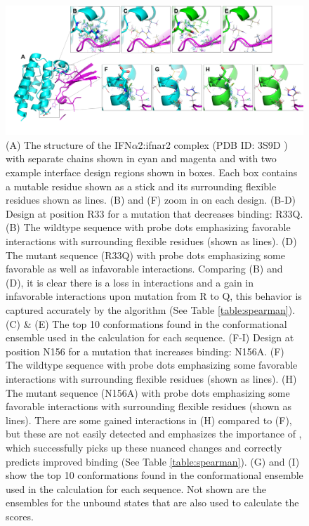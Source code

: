 \begin{figure}
 \center
 \includegraphics[width=\textwidth]{figures/designExamples.png}
 \caption{(A) The structure of the IFN$\alpha$2:ifnar2 complex (PDB ID: 3S9D \cite{pdb3s9d}) with separate chains shown in cyan and magenta and with two example interface design regions shown in boxes. Each box contains a mutable residue shown as a stick and its surrounding flexible residues shown as lines. (B) and (F) zoom in on each design. (B-D) Design at position R33 for a mutation that decreases binding: R33Q. (B) The wildtype sequence with probe dots \cite{Probe} emphasizing favorable interactions with surrounding flexible residues (shown as lines). (D) The mutant sequence (R33Q) with probe dots emphasizing some favorable as well as infavorable interactions. Comparing (B) and (D), it is clear there is a loss in interactions and a gain in infavorable interactions upon mutation from R to Q, this behavior is captured accurately by the \ks algorithm (See Table \ref{table:spearman}). (C) \& (E) The top 10 conformations found in the conformational ensemble used in the \ks calculation for each sequence. (F-I) Design at position N156 for a mutation that increases binding: N156A. (F) The wildtype sequence with probe dots emphasizing some favorable interactions with surrounding flexible residues (shown as lines). (H) The mutant sequence (N156A) with probe dots emphasizing some favorable interactions with surrounding flexible residues (shown as lines). There are some gained interactions in (H) compared to (F), but these are not easily detected and emphasizes the importance of \ks, which successfully picks up these nuanced changes and correctly predicts improved binding (See Table \ref{table:spearman}). (G) and (I) show the top 10 conformations found in the conformational ensemble used in the \ks calculation for each sequence. Not shown are the ensembles for the unbound states that are also used to calculate the \ks scores.}
\label{fig:designs}
\end{figure}

